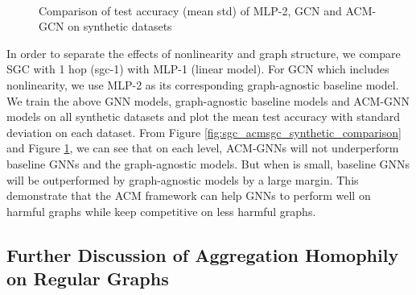 \documentclass{article}
\newcommand{\0}{{\boldsymbol{0}}}
\newcommand{\6}{{\partial}}
\newcommand{\8}{{\infty}}
\newcommand{\4}{{\nabla}}
\begin{document}
\begin{figure}[H]
    \centering
     { 
      \\
     }
     \caption{Comparison of test accuracy (mean  std) of MLP-2, GCN and ACM-GCN on synthetic datasets}
     \label{fig:gcn_acmgcn_synthetic_comparison}
\end{figure}

In order to separate the effects of nonlinearity and graph structure, we compare SGC with 1 hop (sgc-1) with MLP-1 (linear model). For GCN which includes nonlinearity, we use MLP-2 as its corresponding graph-agnostic baseline model. We train the above GNN models, graph-agnostic baseline models and ACM-GNN models on all synthetic datasets and plot the mean test accuracy with standard deviation on each dataset. From Figure \ref{fig:sgc_acmsgc_synthetic_comparison} and Figure \ref{fig:gcn_acmgcn_synthetic_comparison}, we can see that on each  level, ACM-GNNs will not underperform baseline GNNs and the graph-agnostic models. But when  is small, baseline GNNs will be outperformed by graph-agnostic models by a large margin. This demonstrate that the ACM framework can help GNNs to perform well on harmful graphs while keep competitive on less harmful graphs.

\subsection{Further Discussion of Aggregation Homophily on Regular Graphs}
\end{document}
